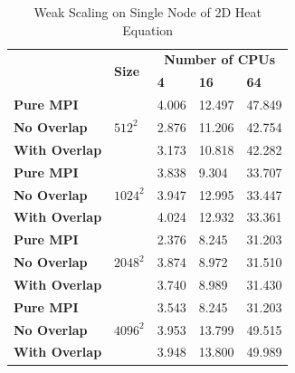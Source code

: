 \begin{table}
  \caption{Weak Scaling on Single Node of 2D Heat Equation}
  \label{TAB:Benchmark:Weak_PURE_MPI}
  \begin{minipage}{\columnwidth}
    \begin{center}
      \begin{tabular}{>{\bfseries}p{3cm} p{1.5cm} p{1.5cm} p{1.5cm} p{1cm}}
        \toprule
        \multirow{2}{*}{Strategy}     & \multirow{2}{*}{\bfseries Size} & \multicolumn{3}{c}{\bfseries  Number of CPUs}   \\
                                      &                                  & \bfseries 4   & \bfseries 16   & \bfseries 64   \\
        \midrule
        Pure MPI      & \multirow{3}{*}{$512^2$}      & 4.006  & 12.497  & 47.849 \\
        No Overlap    &                               & 2.876  & 11.206  & 42.754 \\
        With Overlap  &                               & 3.173  & 10.818  & 42.282 \\
        \midrule
        Pure MPI      & \multirow{3}{*}{$1024^2$}     & 3.838  & 9.304   & 33.707 \\
        No Overlap    &                               & 3.947  & 12.995  & 33.447 \\
        With Overlap  &                               & 4.024  & 12.932  & 33.361 \\
        \midrule
        Pure MPI      & \multirow{3}{*}{$2048^2$}     & 2.376  & 8.245   & 31.203 \\
        No Overlap    &                               & 3.874  & 8.972   & 31.510 \\
        With Overlap  &                               & 3.740  & 8.989   & 31.430 \\
        \midrule
        Pure MPI      & \multirow{3}{*}{$4096^2$}     & 3.543  & 8.245   & 31.203 \\
        No Overlap    &                               & 3.953  & 13.799  & 49.515 \\
        With Overlap  &                               & 3.948  & 13.800  & 49.989 \\
        \bottomrule
      \end{tabular}
    \end{center}
  \end{minipage}
\end{table}



